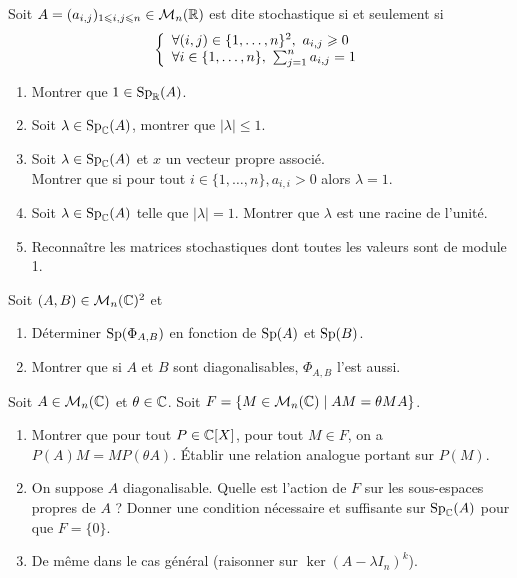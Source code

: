\documentclass[12pt]{article}
\begin{document}
\begin{exercise}
	Soit $A=(a_{i,j})_{1\leqslant i,j\leqslant n}\in\mathcal{M}_{n}(\mathbb{R})$ est dite stochastique si et seulement si
	$$
	\left\{
		\begin{array}[]{l}
			\forall(i,j)\in\{1,\dots,n\}^{2},~a_{i,j}\geqslant0\\
			\forall
			i\in\{1,\dots,n\},~\sum_{j=1}^{n}a_{i,j}=1
		\end{array}
	\right.
	$$
	\begin{enumerate}
		\item Montrer que $1\in\operatorname{Sp}_{\mathbb{R}}(A)$.
		\item Soit $\lambda\in\operatorname{Sp}_{\mathbb{C}}(A)$, montrer que $\vert\lambda\vert\leqslant1$.
		\item Soit $\lambda\in\operatorname{Sp}_{\mathbb{C}}(A)$ et $x$ un vecteur propre associé.\\
		Montrer que si pour tout $i\in\{1,\dots,n\}, a_{i,i}>0$ alors $\lambda=1$.
		\item Soit $\lambda\in\operatorname{Sp}_{\mathbb{C}}(A)$ telle que $\vert \lambda\vert=1$. Montrer que $\lambda$ est une racine de l'unité.
		\item Reconnaître les matrices stochastiques dont toutes les valeurs sont de module 1.
	\end{enumerate}
\end{exercise}

\begin{exercise}
	Soit $(A,B)\in\mathcal{M}_{n}(\mathbb{C})^{2}$ et 
	\begin{enumerate}
		\item Déterminer $\operatorname{Sp}(\Phi_{A,B})$ en fonction de $\operatorname{Sp}(A)$ et $\operatorname{Sp}(B)$.
		\item Montrer que si $A$ et $B$ sont diagonalisables, $\Phi_{A,B}$ l'est aussi.
	\end{enumerate}
\end{exercise}

\begin{exercise}
	Soit $A\in\mathcal{M}_{n}(\mathbb{C})$ et $\theta\in\mathbb{C}$. Soit $F=\{M\in\mathcal{M}_{n}(\mathbb{C})\mid AM=\theta MA\}$.
	\begin{enumerate}
		\item Montrer que pour tout $P\in\mathbb{C}[X]$, pour tout $M\in F$, on a $P(A)M=MP(\theta A)$. Établir une relation analogue portant sur $P(M)$.
		\item On suppose $A$ diagonalisable. Quelle est l'action de $F$ sur les sous-espaces propres de $A$ ? Donner une condition nécessaire et suffisante sur $\operatorname{Sp}_{\mathbb{C}}(A)$ pour que $F=\{0\}$.
		\item De même dans le cas général (raisonner sur $\ker(A-\lambda I_{n})^{k}$).
	\end{enumerate}
\end{exercise}
\end{document}
